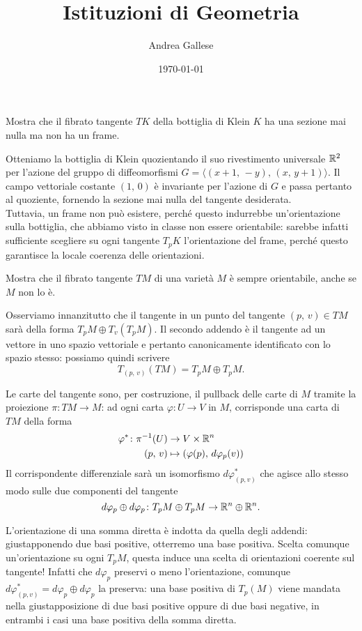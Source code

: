 \documentclass[a4paper]{article}
\title{Istituzioni di Geometria}\let\Title\@title
\author{Andrea Gallese}\let\Author\@author
\date{\today}\let\Date\@date
\begin{document}
	\Intitola
	
\begin{ex}[3.6]{Mostra che il fibrato tangente $ T K $ della bottiglia di Klein $ K $ ha una sezione mai nulla ma non ha un frame.}
	
	Otteniamo la bottiglia di Klein quozientando il suo rivestimento universale $ \mathbb{R}^2 $ per l'azione del gruppo di diffeomorfismi $ G = \langle (x+1, \, -y), \, (x, \, y+1) \rangle $. Il campo vettoriale costante $ (1,\, 0) $ è invariante per l'azione di $ G $ e passa pertanto al quoziente, fornendo la sezione mai nulla del tangente desiderata.\\
	
	Tuttavia, un frame non può esistere, perché questo indurrebbe un'orientazione sulla bottiglia, che abbiamo visto in classe non essere orientabile: sarebbe infatti sufficiente scegliere su ogni tangente $ T_pK $ l'orientazione del frame, perché questo garantisce la locale coerenza delle orientazioni. 
\end{ex}

\begin{ex}[3.7]{Mostra che il fibrato tangente $ TM $ di una varietà $ M $ è sempre orientabile, anche se $ M $ non lo è.}
	
	Osserviamo innanzitutto che il tangente in un punto del tangente $ (p, \, v) \in TM $ sarà della forma $ T_pM \oplus T_v(T_pM) $. Il secondo addendo è il tangente ad un vettore in uno spazio vettoriale e pertanto canonicamente identificato con lo spazio stesso: possiamo quindi scrivere
	$$ T_{(p, \, v)}(TM) = T_pM\oplus T_pM. $$
	
	Le carte del tangente sono, per costruzione, il pullback delle carte di $ M $ tramite la proiezione $ \pi\colon TM \to M $: ad ogni carta $ \varphi\colon U \to V $ in $ M $, corrisponde una carta di $ TM $ della forma
	\begin{align*}
		\varphi^*\colon \pi^{-1}(U) &\to V \times \mathbb{R}^n \\
		(p, \, v)& \mapsto (\varphi(p), \, d\varphi_p(v))	
	\end{align*}
	Il corrispondente differenziale sarà un isomorfismo $ d\varphi^*_{(p, v)} $ che agisce allo stesso modo sulle due componenti del tangente
	\[  d\varphi_p \oplus d\varphi_p \colon T_pM \oplus T_pM \to \mathbb{R}^n \oplus \mathbb{R}^n. \]
	
	L'orientazione di una somma diretta è indotta da quella degli addendi: giustapponendo due basi positive, otterremo una base positiva. Scelta comunque un'orientazione su ogni $ T_pM $, questa induce una scelta di orientazioni coerente sul tangente! Infatti che $ d\varphi_p $ preservi o meno l'orientazione, comunque $ d\varphi^*_{(p, v)} = d\varphi_p \oplus d\varphi_p $ la preserva: una base positiva di $ T_p(M) $ viene mandata nella giustapposizione di due basi positive oppure di due basi negative, in entrambi i casi una base positiva della somma diretta.
	

\end{ex}
\end{document}

